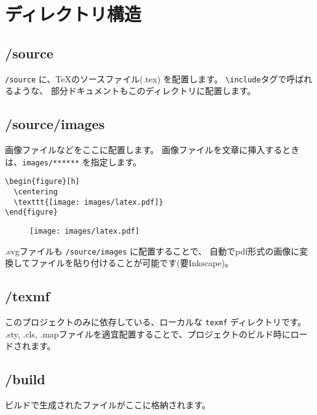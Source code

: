 \section{ディレクトリ構造}

\subsection{/source}

\texttt{/source} に、\TeX のソースファイル(.tex) を配置します。
\texttt{\textbackslash include}タグで呼ばれるような、
部分ドキュメントもこのディレクトリに配置します。

\subsection{/source/images}

画像ファイルなどをここに配置します。
画像ファイルを文章に挿入するときは、\texttt{images/******} を指定します。

\begin{lstlisting}
\begin{figure}[h]
  \centering
  \texttt{[image: images/latex.pdf]}
\end{figure}
\end{lstlisting}

\begin{figure}[h]
  \centering
  \texttt{[image: images/latex.pdf]}
\end{figure}

.svgファイルも \texttt{/source/images} に配置することで、
自動でpdf形式の画像に変換してファイルを貼り付けることが可能です(要Inkscape)。

\subsection{/texmf}

このプロジェクトのみに依存している、ローカルな \texttt{texmf} ディレクトリです。
.sty, .cls, .mapファイルを適宜配置することで、プロジェクトのビルド時にロードされます。

\subsection{/build}

ビルドで生成されたファイルがここに格納されます。
